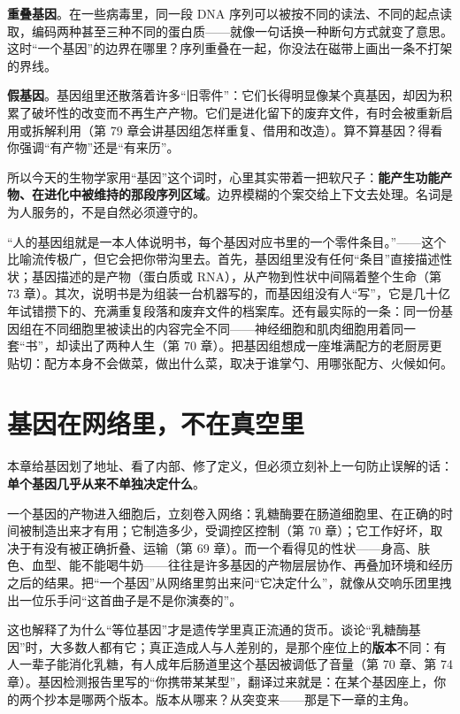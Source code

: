 \textbf{重叠基因}。在一些病毒里，同一段 DNA 序列可以被按不同的读法、不同的起点读取，编码两种甚至三种不同的蛋白质——就像一句话换一种断句方式就变了意思。这时“一个基因”的边界在哪里？序列重叠在一起，你没法在磁带上画出一条不打架的界线。

\textbf{假基因}。基因组里还散落着许多“旧零件”：它们长得明显像某个真基因，却因为积累了破坏性的改变而不再生产产物。它们是进化留下的废弃文件，有时会被重新启用或拆解利用（第 79 章会讲基因组怎样重复、借用和改造）。算不算基因？得看你强调“有产物”还是“有来历”。

所以今天的生物学家用“基因”这个词时，心里其实带着一把软尺子：\textbf{能产生功能产物、在进化中被维持的那段序列区域}。边界模糊的个案交给上下文去处理。名词是为人服务的，不是自然必须遵守的。

\begin{wuqu}
“人的基因组就是一本人体说明书，每个基因对应书里的一个零件条目。”——这个比喻流传极广，但它会把你带沟里去。首先，基因组里没有任何“条目”直接描述性状；基因描述的是产物（蛋白质或 RNA），从产物到性状中间隔着整个生命（第 73 章）。其次，说明书是为组装一台机器写的，而基因组没有人“写”，它是几十亿年试错攒下的、充满重复段落和废弃文件的档案库。还有最实际的一条：同一份基因组在不同细胞里被读出的内容完全不同——神经细胞和肌肉细胞用着同一套“书”，却读出了两种人生（第 70 章）。把基因组想成一座堆满配方的老厨房更贴切：配方本身不会做菜，做出什么菜，取决于谁掌勺、用哪张配方、火候如何。
\end{wuqu}

\section{基因在网络里，不在真空里}

本章给基因划了地址、看了内部、修了定义，但必须立刻补上一句防止误解的话：\textbf{单个基因几乎从来不单独决定什么}。

一个基因的产物进入细胞后，立刻卷入网络：乳糖酶要在肠道细胞里、在正确的时间被制造出来才有用；它制造多少，受调控区控制（第 70 章）；它工作好坏，取决于有没有被正确折叠、运输（第 69 章）。而一个看得见的性状——身高、肤色、血型、能不能喝牛奶——往往是许多基因的产物层层协作、再叠加环境和经历之后的结果。把“一个基因”从网络里剪出来问“它决定什么”，就像从交响乐团里拽出一位乐手问“这首曲子是不是你演奏的”。

这也解释了为什么“等位基因”才是遗传学里真正流通的货币。谈论“乳糖酶基因”时，大多数人都有它；真正造成人与人差别的，是那个座位上的\textbf{版本}不同：有人一辈子能消化乳糖，有人成年后肠道里这个基因被调低了音量（第 70 章、第 74 章）。基因检测报告里写的“你携带某某型”，翻译过来就是：在某个基因座上，你的两个抄本是哪两个版本。版本从哪来？从突变来——那是下一章的主角。

